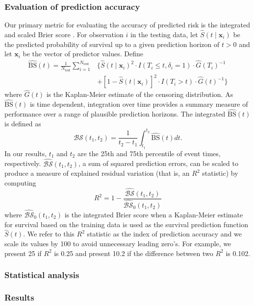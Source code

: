 \documentclass[twoside,11pt]{article}\usepackage[]{graphicx}\usepackage[]{xcolor}
\newcommand{\ie}{that is}
\newcommand{\bstat}{\widehat{\text{BS}}(t)}
\newcommand{\bsbar}{\mathcal{\widehat{BS}}(t_1, t_2)}
\newcommand{\bskap}{\mathcal{\widehat{BS}}_0(t_1, t_2)}
\newcommand{\ntest}{N_{\text{test}}}
\begin{document}
\subsubsection{Evaluation of prediction accuracy} \label{sec:prediction_accuracy}

Our primary metric for evaluating the accuracy of predicted risk is the integrated and scaled Brier score \citep{graf1999assessment}. For observation $i$ in the testing data, let $\widehat{S}(t \mid \bm{x}_i)$ be the predicted probability of survival up to a given prediction horizon of $t > 0$ and let $\bm{x}_i$ be the vector of predictor values. Define \begin{align*}
\bstat = \frac{1}{\ntest} \sum_{i=1}^{\ntest} &\{ \widehat{S}(t \mid \bm{x}_i)^2 \cdot I(T_i \leq t, \delta_i = 1) \cdot \widehat{G}(T_i)^{-1} \\ &+ [1-\widehat{S}(t \mid \bm{x}_i)]^2 \cdot I(T_i > t) \cdot \widehat{G}(t)^{-1}\}
\end{align*} where $\widehat{G}(t)$ is the Kaplan-Meier estimate of the censoring distribution. As $\bstat$ is time dependent, integration over time provides a summary measure of performance over a range of plausible prediction horizons. The integrated $\bstat$ is defined as \begin{equation}
\bsbar = \frac{1}{t_2 - t_1}\int_{t_1}^{t_2} \widehat{\text{BS}}(t) dt.
\end{equation} In our results, $t_1$ and $t_2$ are the 25th and 75th percentile of event times, respectively. $\bsbar$, a sum of squared prediction errors, can be scaled to produce a measure of explained residual variation (\ie, an $R^2$ statistic) by computing \begin{equation}
R^2 = 1 - \frac{\bsbar}{\bskap}
\end{equation} where $\bskap$ is the integrated Brier score when a Kaplan-Meier estimate for survival based on the training data is used as the survival prediction function $\widehat{S}(t)$. We refer to this $R^2$ statistic as the index of prediction accuracy and we scale its values by 100 to avoid unnecessary leading zero's. For example, we present 25 if $R^2$ is 0.25 and present 10.2 if the difference between two $R^2$ is 0.102.

\subsubsection{Statistical analysis}

\subsubsection{Results}
\end{document}
